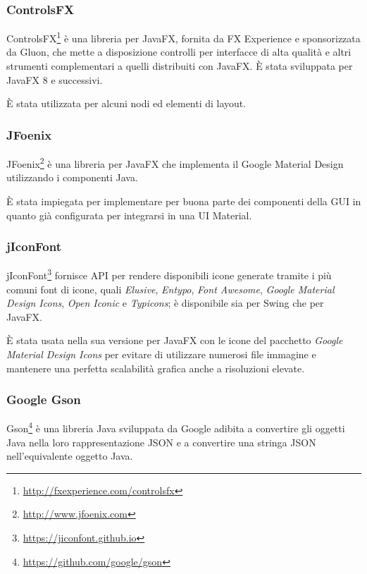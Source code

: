             \subsubsection{ControlsFX}\label{subsubsec:controlsfx}
                ControlsFX\footnote{\url{http://fxexperience.com/controlsfx}} è una libreria  per JavaFX, fornita da FX Experience e sponsorizzata da Gluon, che mette a disposizione controlli per interfacce di alta qualità e altri strumenti complementari a quelli distribuiti con JavaFX.
                È stata sviluppata per JavaFX 8 e successivi.

                È stata utilizzata per alcuni nodi ed elementi di layout.

            \subsubsection{JFoenix}\label{subsubsec:jfoenix}
                JFoenix\footnote{\url{http://www.jfoenix.com}} è una libreria  per JavaFX che implementa il Google Material Design utilizzando i componenti Java.

                È stata impiegata per implementare per buona parte dei componenti della GUI in quanto già configurata per integrarsi in una UI Material.

            \subsubsection{jIconFont}\label{subsubsec:jiconfont}
                jIconFont\footnote{\url{https://jiconfont.github.io}} fornisce API per rendere disponibili icone generate tramite i più comuni font di icone, quali \emph{Elusive}, \emph{Entypo}, \emph{Font Awesome}, \emph{Google Material Design Icons}, \emph{Open Iconic} e \emph{Typicons};
                è disponibile sia per Swing che per JavaFX.

                È stata usata nella sua versione per JavaFX con le icone del pacchetto \emph{Google Material Design Icons} per evitare di utilizzare numerosi file immagine e mantenere una perfetta scalabilità grafica anche a risoluzioni elevate.

            \subsubsection{Google Gson}\label{subsubsec:gson}
                Gson\footnote{\url{https://github.com/google/gson}} è una libreria Java  sviluppata da Google adibita a convertire gli oggetti Java nella loro rappresentazione JSON e a convertire una stringa JSON nell'equivalente oggetto Java.

